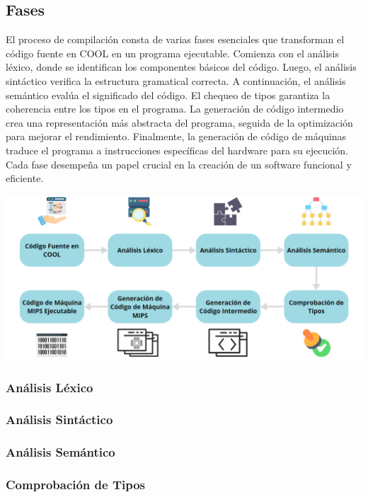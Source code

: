 \documentclass[10pt]{article} %
\begin{document}
	\subsection{Fases}
	
	El proceso de compilación consta de varias fases esenciales que transforman el código fuente en COOL en un programa ejecutable. Comienza con el análisis léxico, donde se identifican los componentes básicos del código. Luego, el análisis sintáctico verifica la estructura gramatical correcta. A continuación, el análisis semántico evalúa el significado del código. El chequeo de tipos garantiza la coherencia entre los tipos en el programa. La generación de código intermedio crea una representación más abstracta del programa, seguida de la optimización para mejorar el rendimiento. Finalmente, la generación de código de máquinas traduce el programa a instrucciones específicas del hardware para su ejecución. Cada fase desempeña un papel crucial en la creación de un software funcional y eficiente.
	
	\includegraphics[width=15cm]{flow}
	
	\subsubsection{An\'alisis L\'exico}
	
	\subsubsection{An\'alisis Sint\'actico}
	
	\subsubsection{An\'alisis Sem\'antico}
	
	\subsubsection{Comprobaci\'on de Tipos}
	
\end{document}
